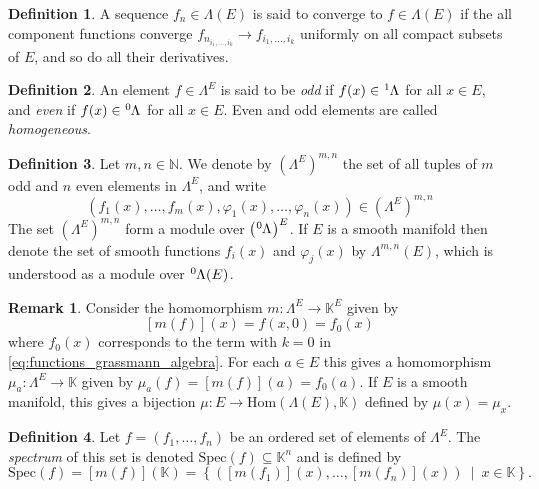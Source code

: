 \documentclass{article}
\theoremstyle{definition}
\newtheorem{definition}{Definition}
\newtheorem*{remark}{Remark}
\begin{document}
\begin{definition}
    A sequence $f_n \in \Lambda(E)$ is said to converge to $f \in \Lambda(E)$ if the all component functions converge $f_{n_{i_1, \dots, i_k}} \rightarrow f_{i_1, \dots, i_k}$ uniformly on all compact subsets of $E$, and so do all their derivatives.
\end{definition}

\begin{definition}
    An element $f \in \Lambda^E$ is said to be \emph{odd} if $f(x) \in \tensor[^1]{\Lambda}{}$ for all $x \in E$, and \emph {even} if $f(x) \in \tensor[^0]{\Lambda}{}$ for all $x \in E$. Even and odd elements are called \emph{homogeneous}.
\end{definition}

\begin{definition}
    Let $m, n \in \mathbb{N}$. We denote by $\left( \Lambda^E \right)^{m, n}$ the set of all tuples of $m$ odd and $n$ even elements in $\Lambda^E$, and write
    \begin{equation*}
        (f_1(x), \dots, f_m(x), \varphi_1(x), \dots, \varphi_n(x)) \in 
        \left( \Lambda^E \right)^{m, n}
    \end{equation*}
    The set $\left( \Lambda^E \right)^{m, n}$ form a module over $\left( \tensor[^0]{\Lambda}{} \right)^E$. If $E$ is a smooth manifold then denote the set of smooth functions $f_i(x)$ and $\varphi_j(x)$ by $\Lambda^{m, n}(E)$, which is understood as a module over $\tensor[^0]{\Lambda(E)}{}$.
\end{definition}

\begin{remark}
    Consider the homomorphism $m: \Lambda^E \rightarrow \mathbb{K}^E$ given by
    \begin{equation*}
        \left[ m(f)\right] (x) = f(x, 0) = f_0(x)
    \end{equation*}
    where $f_0(x)$ corresponds to the term with $k = 0$ in \eqref{eq:functions_grassmann_algebra}. For each $a \in E$ this gives a homomorphism $\mu_a: \Lambda^E \rightarrow \mathbb{K}$ given by $\mu_a(f) = \left[ m(f) \right](a) = f_0(a)$. If $E$ is a smooth manifold, this gives a bijection $\mu: E \rightarrow \text{Hom}(\Lambda(E), \mathbb{K})$ defined by $\mu(x) = \mu_x$.
\end{remark}

\begin{definition}
    Let $f = (f_1, \dots, f_n)$ be an ordered set of elements of $\Lambda^E$. The \emph{spectrum} of this set is denoted $\text{Spec}(f) \subseteq \mathbb{K}^n$ and is defined by
    \begin{equation*}
        \text{Spec}(f) = \left[ m(f) \right] (\mathbb{K}) 
        = \left\{ \left( \left[ m(f_1) \right](x), \dots, \left[ m(f_n) \right](x) \right) \ \middle| \ x \in \mathbb{K} \right\}.
    \end{equation*}
\end{definition}
\end{document}

